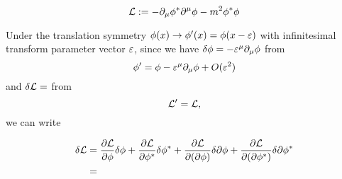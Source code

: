 \documentclass{../../large}
\begin{document}
\[\mathcal{L}:=-\partial_\mu\phi^*\partial^\mu\phi-m^2\phi^*\phi\]

Under the translation symmetry $\phi(x)\to\phi'(x)=\phi(x-\varepsilon)$ with infinitesimal transform parameter vector $\varepsilon$, since we have $\delta\phi=-\varepsilon^\mu\partial_\mu\phi$ from
\[\phi'=\phi-\varepsilon^\mu\partial_\mu\phi+O(\varepsilon^2)\]
and $\delta\mathcal{L}=$ from
\[\mathcal{L}'=\mathcal{L},\]
we can write

\begin{align*}
\delta\mathcal{L}
&=\frac{\partial\mathcal{L}}{\partial\phi}\delta\phi+\frac{\partial\mathcal{L}}{\partial\phi^*}\delta\phi^*+\frac{\partial\mathcal{L}}{\partial(\partial\phi)}\delta\partial\phi+\frac{\partial\mathcal{L}}{\partial(\partial\phi^*)}\delta\partial\phi^*\\
&=
\end{align*}
\end{document}
